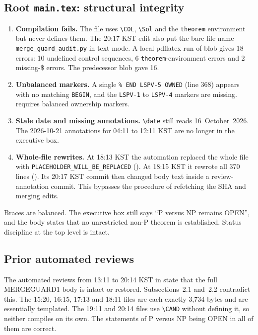 \documentclass[11pt]{article}
\newcommand{\CAND}{\textbf{CANDIDATE}}
\begin{document}
\subsection{Root \texttt{main.tex}: structural integrity}
\begin{enumerate}
\item \textbf{Compilation fails.} The file uses \verb|\COL|, \verb|\Sol| and
the \texttt{theorem} environment but never defines them. The 20:17 KST
edit also put the bare file name \texttt{merge\_guard\_audit.py} in text
mode. A local pdflatex run of blob  gives 18 errors:
10 undefined control sequences, 6 \texttt{theorem}-environment errors and
2 missing-\$ errors. The predecessor blob  gave 16.
\item \textbf{Unbalanced markers.} A single \verb|% END LSPV-5 OWNED|
(line 368) appears with no matching \texttt{BEGIN}, and the
\texttt{LSPV-1} to \texttt{LSPV-4} markers are missing.
 requires balanced ownership markers.
\item \textbf{Stale date and missing annotations.} \verb|\date| still reads
16~October~2026. The 2026-10-21 annotations for 04:11 to 12:11 KST are
no longer in the executive box.
\item \textbf{Whole-file rewrites.} At 18:13 KST the automation replaced
the whole file with \texttt{PLACEHOLDER\_WILL\_BE\_REPLACED}
(). At 18:15 KST it rewrote all 370 lines
(). Its 20:17 KST commit then changed body text inside a
review-annotation commit. This bypasses the  procedure of
refetching the SHA and merging edits.
\end{enumerate}
Braces are balanced. The executive box still says ``P versus NP remains
OPEN'', and the body states that no unrestricted non-P theorem is
established. Status discipline at the top level is intact.

\subsection{Prior automated reviews}
The automated reviews from 13:11 to 20:14 KST in
 state that the full MERGEGUARD1 body
is intact or restored. Subsections~2.1 and~2.2 contradict this. The
15:20, 16:15, 17:13 and 18:11 files are each exactly 3{,}734 bytes and
are essentially templated. The 19:11 and 20:14 files use \verb|\CAND|
without defining it, so neither compiles on its own. The statements of
P versus NP being OPEN in all of them are correct.
\end{document}
